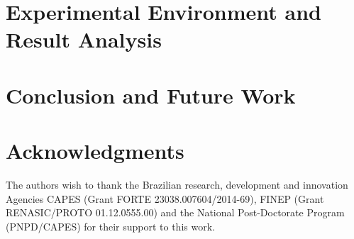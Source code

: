 \documentclass[3p,times]{elsarticle}
\begin{document}
\section{Experimental Environment and Result Analysis}
\label{experimental_tests}

\section{Conclusion and Future Work}
\label{conclusion}



\section*{Acknowledgments}
The authors wish to thank the Brazilian research, development and innovation 
Agencies CAPES (Grant FORTE 23038.007604/2014-69), 
FINEP (Grant RENASIC/PROTO 01.12.0555.00) and the National Post-Doctorate Program (PNPD/CAPES) for their support to this work.











\end{document}
